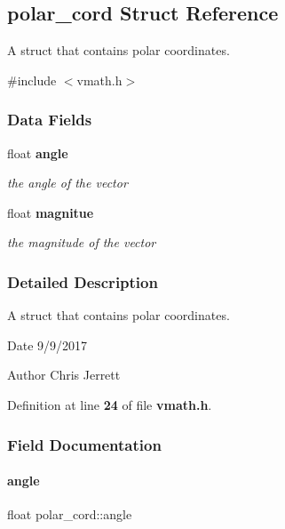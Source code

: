 \subsection{polar\+\_\+cord Struct Reference}
\label{structpolar__cord}


A struct that contains polar coordinates.  




{\ttfamily \#include $<$vmath.\+h$>$}

\subsubsection*{Data Fields}
\begin{DoxyCompactItemize}
\item 
float \textbf{ angle}
\begin{DoxyCompactList}\small\item\em the angle of the vector \end{DoxyCompactList}\item 
float \textbf{ magnitue}
\begin{DoxyCompactList}\small\item\em the magnitude of the vector \end{DoxyCompactList}\end{DoxyCompactItemize}


\subsubsection{Detailed Description}
A struct that contains polar coordinates. 

\begin{DoxyDate}{Date}
9/9/2017 
\end{DoxyDate}
\begin{DoxyAuthor}{Author}
Chris Jerrett 
\end{DoxyAuthor}


Definition at line \textbf{ 24} of file \textbf{ vmath.\+h}.



\subsubsection{Field Documentation}
\mbox{\label{structpolar__cord_a81b3a11d38d76719b02fcd425adaa216}} 
\paragraph{angle}
{\footnotesize\ttfamily float polar\+\_\+cord\+::angle}




